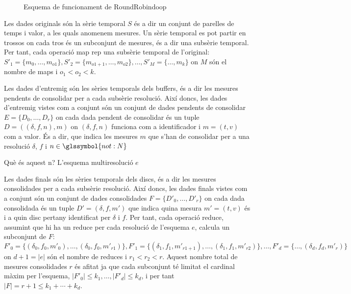 \begin{figure}[tp]
  
  \caption{Esquema de funcionament de RoundRobindoop}
  \label{fig:roundrobindoop:esquema}
\end{figure}






Les dades originals són la sèrie temporal $S$ és a dir un conjunt de
parelles de temps i valor, a les quals anomenem mesures. Un sèrie
temporal es pot partir en trossos on cada tros és un subconjunt de
mesures, és a dir una subsèrie temporal. Per tant, cada operació map
rep una subsèrie temporal de l'original: $S'_1 =
\{m_0,\dotsc,m_{o1}\}, S'_2 = \{m_{o1+1},\dotsc,m_{o2}\}, \dotsc, S'_M
= \{\dotsc,m_{k}\}$ on $M$ són el nombre de maps i $o_1 < o_2 < k$.



\todo{} Les dades d'entremig són les sèries temporals dels buffers, és
a dir les mesures pendents de consolidar per a cada subsèrie
resolució.  Així doncs, les dades d'entremig vistes com a conjunt són
un conjunt de dades pendents de consolidar $E=\{ D_{0}, \dotsc, D_r\}$
on cada dada pendent de consolidar és un tuple $D=((\delta,f,n),m)$ on
$(\delta,f,n)$ funciona com a identificador i $m=(t,v)$ com a valor.
És a dir, que indica les mesures $m$ que s'han de consolidar per a una
resolució $\delta$, $f$ i $n\in\glssymbol{not:N}$


Què és aquest n?\todo{}
L'esquema multiresolució $e$ 





Les dades finals són les sèries temporals dels discs, és a dir les
mesures consolidades per a cada subsèrie resolució. Així doncs, les
dades finals vistes com a conjunt són un conjunt de dades consolidades
$F=\{ D'_{0}, \dotsc, D'_r\}$ on cada dada consolidada és un tuple
$D'=(\delta,f,m')$ que indica quina mesura $m'=(t,v)$ és i a quin disc
pertany identificat per $\delta$ i $f$.  Per tant, cada operació
reduce, assumint que hi ha un reduce per cada resolució de l'esquema
$e$, calcula un subconjunt de $F$: $F'_0 =
\{(\delta_0,f_0,m'_0),\dotsc,(\delta_0,f_0,m'_{r1})\}, F'_1 =
\{(\delta_1,f_1,m'_{r1+1}),\dotsc,(\delta_1,f_1,m'_{r2})\},\dotsc,F'_d
= \{\dotsc,(\delta_d,f_d,m'_{r})\}$ on $d+1=|e|$ són el nombre de
reduces i $r_1 < r_2 < r$. Aquest nombre total de mesures consolidades
$r$ és afitat ja que cada subconjunt té limitat el cardinal màxim per
l'esquema, $|F'_0| \leq k_1, \dotsc, |F'_d| \leq k_d$, i
per tant $|F|=r+1 \leq k_1 + \dotsb + k_d$.




